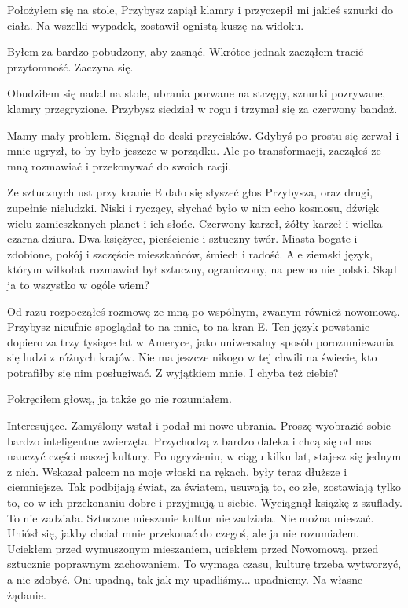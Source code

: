 Położyłem się na stole, Przybysz zapiął klamry i przyczepił mi jakieś sznurki do ciała.
Na wszelki wypadek, zostawił ognistą kuszę na widoku.

Byłem za bardzo pobudzony, aby zasnąć. Wkrótce jednak zacząłem tracić przytomność. Zaczyna się.

\divider{}
Obudziłem się nadal na stole, ubrania porwane na strzępy, sznurki pozrywane, klamry przegryzione.
Przybysz siedział w rogu i trzymał się za czerwony bandaż.

\ds{} Mamy mały problem.
\dm{} Sięgnął do deski przycisków.
\dm{} Gdybyś po prostu się zerwał i mnie ugryzł, to by było jeszcze w porządku.
Ale po transformacji, zacząłeś ze mną rozmawiać i przekonywać do swoich racji. \de{}

Ze sztucznych ust przy kranie E dało się słyszeć głos Przybysza, oraz drugi, zupełnie nieludzki.
Niski i ryczący, słychać było w nim echo kosmosu, dźwięk wielu zamieszkanych planet i ich słońc.
Czerwony karzeł, żółty karzeł i wielka czarna dziura. 
Dwa księżyce, pierścienie i sztuczny twór.
Miasta bogate i zdobione, pokój i szczęście mieszkańców, śmiech i radość.
Ale ziemski język, którym wilkołak rozmawiał był sztuczny, ograniczony, na pewno nie polski.
Skąd ja to wszystko w ogóle wiem?

\ds{} Od razu rozpocząłeś rozmowę ze mną po wspólnym, zwanym również nowomową. 
\dm{} Przybysz nieufnie spoglądał to na mnie, to na kran E. 
\dm{} Ten język powstanie dopiero za trzy tysiące lat w Ameryce, jako uniwersalny sposób porozumiewania się ludzi z różnych krajów.
Nie ma jeszcze nikogo w tej chwili na świecie, kto potrafiłby się nim posługiwać.
Z wyjątkiem mnie. I chyba też ciebie? \de{}

Pokręciłem głową, ja także go nie rozumiałem.

\ds{} Interesujące.
\dm{} Zamyślony wstał i podał mi nowe ubrania.
\dm{} Proszę wyobrazić sobie bardzo inteligentne zwierzęta. 
Przychodzą z bardzo daleka i chcą się od nas nauczyć części naszej kultury.
Po ugryzieniu, w ciągu kilku lat, stajesz się jednym z nich. 
\dm{} Wskazał palcem na moje włoski na rękach, były teraz dłuższe i ciemniejsze.
\dm{} Tak podbijają świat, za światem, usuwają to, co złe, zostawiają tylko to, co w ich przekonaniu dobre i przyjmują u siebie.
\dm{} Wyciągnął książkę z szuflady.
\dm{} To nie zadziała. Sztuczne mieszanie kultur nie zadziała. Nie można mieszać.
\dm{} Uniósł się, jakby chciał mnie przekonać do czegoś, ale ja nie rozumiałem.
\dm{} Uciekłem przed wymuszonym mieszaniem, uciekłem przed Nowomową, przed sztucznie poprawnym zachowaniem.
To wymaga czasu, kulturę trzeba wytworzyć, a nie zdobyć.
Oni upadną, tak jak my upadliśmy... upadniemy. Na własne żądanie. \de{}

